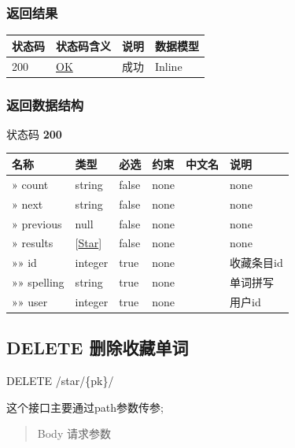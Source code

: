 \documentclass[
]{article}
\begin{document}
\hypertarget{ux8fd4ux56deux7ed3ux679c-33}{%
\subsubsection{返回结果}\label{ux8fd4ux56deux7ed3ux679c-33}}

\begin{longtable}[]{@{}llll@{}}
\toprule
状态码 & 状态码含义 & 说明 & 数据模型 \\
\midrule
\endhead
200 & \href{https://tools.ietf.org/html/rfc7231\#section-6.3.1}{OK} &
成功 & Inline \\
\bottomrule
\end{longtable}

\hypertarget{ux8fd4ux56deux6570ux636eux7ed3ux6784-26}{%
\subsubsection{返回数据结构}\label{ux8fd4ux56deux6570ux636eux7ed3ux6784-26}}

状态码 \textbf{200}

\begin{longtable}[]{@{}llllll@{}}
\toprule
名称 & 类型 & 必选 & 约束 & 中文名 & 说明 \\
\midrule
\endhead
» count & string & false & none & & none \\
» next & string & false & none & & none \\
» previous & null & false & none & & none \\
» results & {[}\protect\hyperlink{schemastar}{Star}{]} & false & none &
& none \\
»» id & integer & true & none & & 收藏条目id \\
»» spelling & string & true & none & & 单词拼写 \\
»» user & integer & true & none & & 用户id \\
\bottomrule
\end{longtable}

\hypertarget{delete-ux5220ux9664ux6536ux85cfux5355ux8bcd-2}{%
\subsection{DELETE
删除收藏单词}\label{delete-ux5220ux9664ux6536ux85cfux5355ux8bcd-2}}

DELETE /star/\{pk\}/

这个接口主要通过path参数传参;

\begin{quote}
Body 请求参数
\end{quote}
\end{document}
